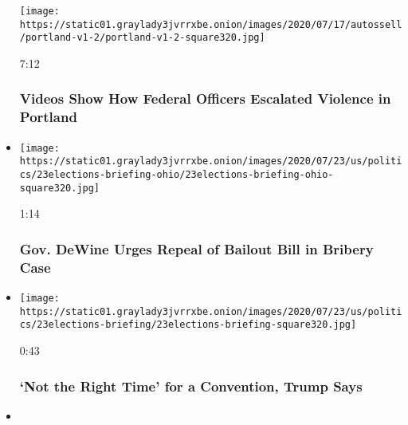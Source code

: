 \begin{itemize}
  \texttt{[image: https://static01.graylady3jvrrxbe.onion/images/2020/07/17/autossell/portland-v1-2/portland-v1-2-square320.jpg]}

  7:12

  \hypertarget{videos-show-how-federal-officers-escalated-violence-in-portland}{%
  \subsubsection{Videos Show How Federal Officers Escalated Violence in
  Portland}\label{videos-show-how-federal-officers-escalated-violence-in-portland}}
\item
  \href{https://www.nytimes3xbfgragh.onion/video/us/100000007253892/mike-dewine-repeal-law-bribery-case.html?action=click\&module=video-series-bar\&region=header\&pgtype=Article\&playlistId=video/us-politics}{}

  \texttt{[image: https://static01.graylady3jvrrxbe.onion/images/2020/07/23/us/politics/23elections-briefing-ohio/23elections-briefing-ohio-square320.jpg]}

  1:14

  \hypertarget{gov-dewine-urges-repeal-of-bailout-bill-in-bribery-case}{%
  \subsubsection{Gov. DeWine Urges Repeal of Bailout Bill in Bribery
  Case}\label{gov-dewine-urges-repeal-of-bailout-bill-in-bribery-case}}
\item
  \href{https://www.nytimes3xbfgragh.onion/video/us/100000007253968/trump-cancels-gop-convention.html?action=click\&module=video-series-bar\&region=header\&pgtype=Article\&playlistId=video/us-politics}{}

  \texttt{[image: https://static01.graylady3jvrrxbe.onion/images/2020/07/23/us/politics/23elections-briefing/23elections-briefing-square320.jpg]}

  0:43

  \hypertarget{not-the-right-time-for-a-convention-trump-says}{%
  \subsubsection{`Not the Right Time' for a Convention, Trump
  Says}\label{not-the-right-time-for-a-convention-trump-says}}
\item
  \href{https://www.nytimes3xbfgragh.onion/video/us/100000007253391/aoc-confronts-yoho.html?action=click\&module=video-series-bar\&region=header\&pgtype=Article\&playlistId=video/us-politics}{}


\end{itemize}
